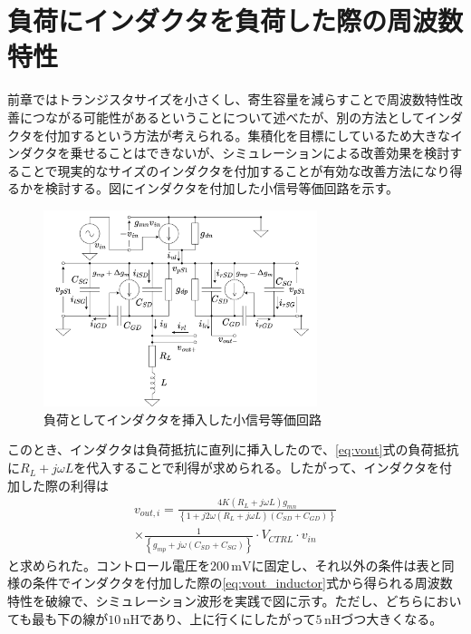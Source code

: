 \documentclass[twocolumn]{jsarticle}
\begin{document}
\section{負荷にインダクタを負荷した際の周波数特性}
    前章ではトランジスタサイズを小さくし、寄生容量を減らすことで周波数特性改善につながる可能性があるということについて述べたが、別の方法としてインダクタを付加するという方法が考えられる。集積化を目標にしているため大きなインダクタを乗せることはできないが、シミュレーションによる改善効果を検討することで現実的なサイズのインダクタを付加することが有効な改善方法になり得るかを検討する。図にインダクタを付加した小信号等価回路を示す。
    \begin{figure}[H]
        \begin{center}
            \includegraphics*[width = 80mm]{figures/ParasiticInductorHalfEquivalent.png}
            \caption{負荷としてインダクタを挿入した小信号等価回路}
            \label{fig:inductor}
        \end{center}
    \end{figure}
    このとき、インダクタは負荷抵抗に直列に挿入したので、\eqref{eq:vout}式の負荷抵抗に$R_{L}+j\omega L$を代入することで利得が求められる。したがって、インダクタを付加した際の利得は
    \begin{multline}
        v_{out,i} = \frac{4K(R_{L}+j\omega L)g_{mn}}{ \left\{ 1+j2\omega(R_{L}+j\omega L)(C_{SD}+C_{GD}) \right\}}\\
        \times\frac{1}{\left\{ g_{mp}+j\omega(C_{SD}+C_{SG}) \right\}} \cdot V_{CTRL}\cdot v_{in}   \label{eq:vout_inductor}
    \end{multline}
    と求められた。コントロール電圧を$200\,\mathrm{mV}$に固定し、それ以外の条件は表と同様の条件でインダクタを付加した際の\eqref{eq:vout_inductor}式から得られる周波数特性を破線で、シミュレーション波形を実践で図に示す。ただし、どちらにおいても最も下の線が$10\,\mathrm{nH}$であり、上に行くにしたがって$5\,\mathrm{nH}$づつ大きくなる。
\end{document}
